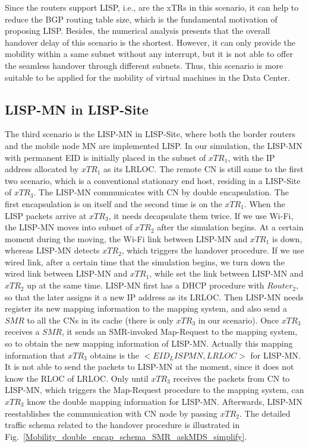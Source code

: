 Since the routers support LISP, i.e., are the xTRs in this scenario, it can help to reduce the BGP routing table size, which is the fundamental motivation of proposing LISP. Besides, the numerical analysis presents that the overall handover delay of this scenario is the shortest. However, it can only provide the mobility within a same subnet without any interrupt, but it is not able to offer the seamless handover through different subnets. Thus, this scenario is more suitable to be applied for the mobility of virtual machines in the Data Center.

\subsection{LISP-MN in LISP-Site}
\label{sec:ns3_analysis_lispmn_xTR}
The third scenario is the LISP-MN in LISP-Site, where both the border routers and the mobile node MN are implemented LISP. In our simulation, the LISP-MN with permanent EID is initially placed in the subnet of $xTR_1$, with the IP address allocated by $xTR_1$ as its LRLOC. The remote CN is still same to the first two scenario, which is a conventional stationary end host, residing in a LISP-Site of $xTR_3$. The LISP-MN communicates with CN by double encapsulation. The first encapsulation is on itself and the second time is on the $xTR_1$. When the LISP packets arrive at $xTR_3$, it needs decapsulate them twice. If we use Wi-Fi, the LISP-MN moves into subnet of $xTR_2$ after the simulation begins. At a certain moment during the moving, the Wi-Fi link between LISP-MN and $xTR_1$ is down, whereas LISP-MN detects $xTR_2$, which triggers the handover procedure. If we use wired link, after a certain time that the simulation begins, we turn down the wired link between LISP-MN and $xTR_1$, while set the link between LISP-MN and $xTR_2$ up at the same time. LISP-MN first has a DHCP procedure with $Router_2$, so that the later assigns it a new IP address as its LRLOC. Then LISP-MN needs register its new mapping information to the mapping system, and also send a $SMR$ to all the CNs in its cache (there is only $xTR_3$ in our scenario). Once $xTR_3$ receives a $SMR$, it sends an SMR-invoked Map-Request to the mapping system, so to obtain the new mapping information of LISP-MN. Actually this mapping information that $xTR_3$ obtains is the $<EID_LISPMN, LRLOC>$ for LISP-MN. It is not able to send the packets to LISP-MN at the moment, since it does not know the RLOC of LRLOC. Only until $xTR_3$ receives the packets from CN to LISP-MN, which triggers the Map-Request procedure to the mapping system, can $xTR_3$ know the double mapping information for LISP-MN. Afterwards, LISP-MN reestablishes the communication with CN node by passing $xTR_2$. The detailed traffic schema related to the handover procedure is illustrated in Fig.~\ref{Mobility_double_encap_schema_SMR_askMDS_simplify}.
